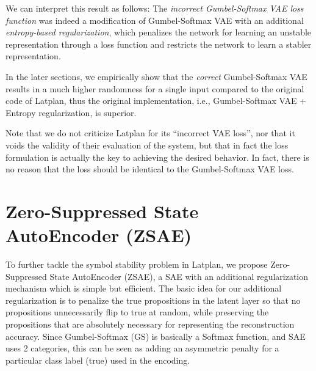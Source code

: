 We can interpret this result as follows:
The \emph{incorrect Gumbel-Softmax VAE loss function}
was indeed a modification of Gumbel-Softmax VAE with an additional \emph{entropy-based regularization},
which penalizes the network for learning an unstable representation
through a loss function and restricts the network to learn a stabler representation.

In the later sections, we empirically show that the \emph{correct} Gumbel-Softmax VAE results in
a much higher randomness for a single input compared to the original code of Latplan,
thus the original implementation, i.e., Gumbel-Softmax VAE + Entropy regularization, is superior.

Note that we do not criticize Latplan for its ``incorrect VAE loss'',
nor that it voids the validity of their evaluation of the system,
but that in fact the loss formulation is actually the key to achieving the desired behavior.
In fact, there is no reason that the loss should be identical to the Gumbel-Softmax VAE loss.

\section{Zero-Suppressed State AutoEncoder (ZSAE)}
\label{zsae}

To further tackle the symbol stability problem in Latplan, we propose Zero-Suppressed State AutoEncoder (ZSAE),
a SAE with an additional regularization mechanism which is simple but efficient.
The basic idea for our additional regularization is to penalize the
true propositions in the latent layer so that no propositions unnecessarily flip to true at random,
while preserving the propositions that are absolutely necessary for representing the reconstruction accuracy.
Since Gumbel-Softmax (GS) is basically a Softmax function,
and SAE uses 2 categories, this can be seen as adding an
asymmetric penalty for a particular class label (true) used in the encoding.

